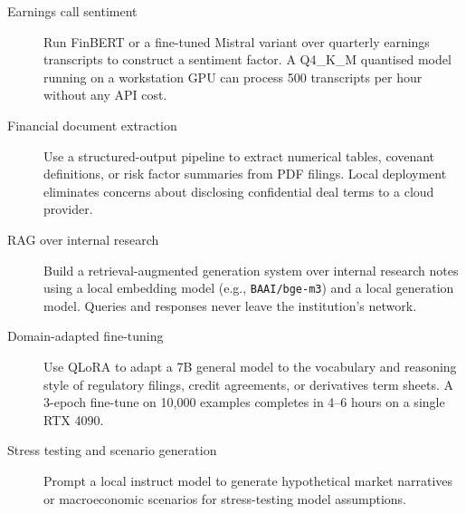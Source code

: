 \begin{description}
  \item[Earnings call sentiment] Run FinBERT or a fine-tuned Mistral variant
        over quarterly earnings transcripts to construct a sentiment factor.
        A Q4\_K\_M quantised model running on a workstation GPU can process
        500 transcripts per hour without any API cost.

  \item[Financial document extraction] Use a structured-output pipeline to
        extract numerical tables, covenant definitions, or risk factor summaries
        from PDF filings.  Local deployment eliminates concerns about disclosing
        confidential deal terms to a cloud provider.

  \item[RAG over internal research] Build a retrieval-augmented generation
        system over internal research notes using a local embedding model (e.g.,
        \texttt{BAAI/bge-m3}) and a local generation model.  Queries and
        responses never leave the institution's network.

  \item[Domain-adapted fine-tuning] Use QLoRA to adapt a 7B general model to
        the vocabulary and reasoning style of regulatory filings, credit
        agreements, or derivatives term sheets.  A 3-epoch fine-tune on 10{,}000
        examples completes in 4--6 hours on a single RTX 4090.

  \item[Stress testing and scenario generation] Prompt a local instruct model
        to generate hypothetical market narratives or macroeconomic scenarios
        for stress-testing model assumptions.
\end{description}

